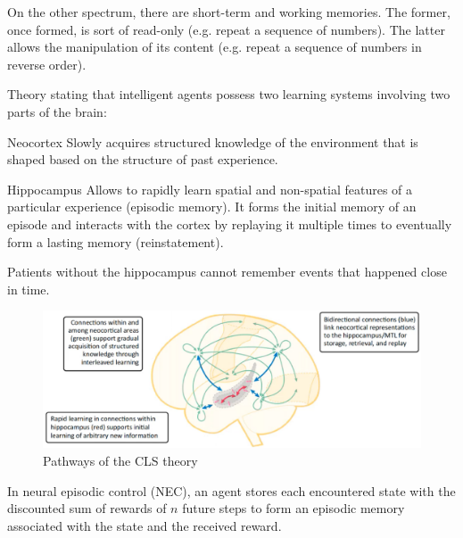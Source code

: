 \begin{description}
        \begin{remark}
            On the other spectrum, there are short-term and working memories.
            The former, once formed, is sort of read-only (e.g. repeat a sequence of numbers). The latter allows the manipulation of its content (e.g. repeat a sequence of numbers in reverse order).
        \end{remark}

    \item[Complementary learning systems (CLS) theory] 
        Theory stating that intelligent agents possess two learning systems involving two parts of the brain:
        \begin{descriptionlist}
            \item[Neocortex] 
                Slowly acquires structured knowledge of the environment that is shaped based on the structure of past experience.
            \item[Hippocampus] 
                Allows to rapidly learn spatial and non-spatial features of a particular experience (episodic memory).
                It forms the initial memory of an episode and interacts with the cortex by replaying it multiple times to eventually form a lasting memory (reinstatement).
                \begin{remark}
                    Patients without the hippocampus cannot remember events that happened close in time.
                \end{remark}
        \end{descriptionlist}
        \begin{figure}[H]
            \centering
            \includegraphics[width=0.7\linewidth]{./img/cls_theory.png}
            \caption{Pathways of the CLS theory}
        \end{figure}

        \begin{casestudy}
            In neural episodic control (NEC), an agent stores each encountered state with the discounted sum of rewards of $n$ future steps to form an episodic memory associated with the state and the received reward.


\end{casestudy}
\end{description}
